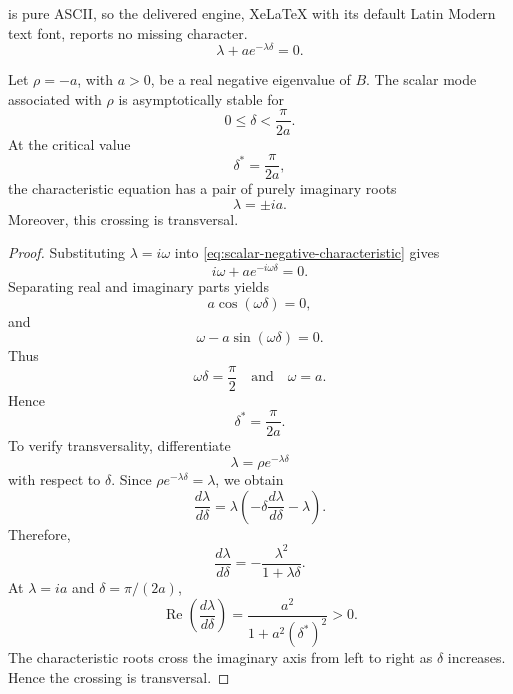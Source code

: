 \documentclass[10pt,a4paper]{amsart}
\begin{document}
is pure ASCII, so the delivered engine, XeLaTeX with its default Latin Modern text font, reports no missing character.
 \begin{equation}
 \label{eq:scalar-negative-characteristic}
 \lambda+a e^{-\lambda\delta}=0.
 \end{equation}

 \begin{theorem}
 	\label{thm:critical-delay-real-negative}
 	Let $\rho=-a$, with $a>0$, be a real negative eigenvalue of $B$. The scalar
 	mode associated with $\rho$ is asymptotically stable for
 	\[
 	0\leq \delta<\frac{\pi}{2a}.
 	\]
 	At the critical value
 	\[
 	\delta^\ast=\frac{\pi}{2a},
 	\]
 	the characteristic equation has a pair of purely imaginary roots
 	\[
 	\lambda=\pm ia.
 	\]
 	Moreover, this crossing is transversal.
 \end{theorem}

 \begin{proof}
 	Substituting $\lambda=i\omega$ into
 	\eqref{eq:scalar-negative-characteristic} gives
 	\[
 	i\omega+a e^{-i\omega\delta}=0.
 	\]
 	Separating real and imaginary parts yields
 	\[
 	a\cos(\omega\delta)=0,
 	\]
 	and
 	\[
 	\omega-a\sin(\omega\delta)=0.
 	\]
 	Thus
 	\[
 	\omega\delta=\frac{\pi}{2}
 	\quad
 	\text{and}
 	\quad
 	\omega=a.
 	\]
 	Hence
 	\[
 	\delta^\ast=\frac{\pi}{2a}.
 	\]
 	To verify transversality, differentiate
 	\[
 	\lambda=\rho e^{-\lambda\delta}
 	\]
 	with respect to $\delta$. Since $\rho e^{-\lambda\delta}=\lambda$, we obtain
 	\[
 	\frac{d\lambda}{d\delta}
 	=
 	\lambda
 	\left(
 	-\delta\frac{d\lambda}{d\delta}
 	-\lambda
 	\right).
 	\]
 	Therefore,
 	\[
 	\frac{d\lambda}{d\delta}
 	=
 	-\frac{\lambda^2}{1+\lambda\delta}.
 	\]
 	At $\lambda=ia$ and $\delta=\pi/(2a)$,
 	\[
 	\operatorname{Re}
 	\left(
 	\frac{d\lambda}{d\delta}
 	\right)
 	=
 	\frac{a^2}{1+a^2(\delta^\ast)^2}
 	>0.
 	\]
 	The characteristic roots cross the imaginary axis from left to right as
 	$\delta$ increases. Hence the crossing is transversal.
 \end{proof}
\end{document}
